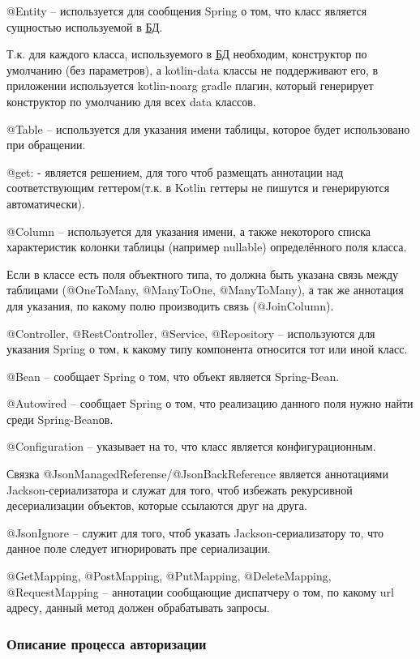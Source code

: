 @Entity – используется для сообщения Spring о том, что класс является сущностью используемой в \hyperlink{gloss:db}{БД}.

Т.к. для каждого класса, используемого в \hyperlink{gloss:db}{БД} необходим, конструктор по умолчанию (без параметров), а kotlin-data классы не поддерживают его, в приложении используется kotlin-noarg gradle плагин, который генерирует конструктор по умолчанию для всех data классов.

@Table – используется для указания имени таблицы, которое будет использовано при обращении.

@get: - является решением, для того чтоб размещать аннотации над соответствующим геттером(т.к. в Kotlin геттеры не пишутся и генерируются автоматически).

@Column – используется для указания имени, а также некоторого списка характеристик колонки таблицы (например nullable) определённого поля класса.

Если в классе есть поля объектного типа, то должна быть указана связь между таблицами (@OneToMany, @ManyToOne, @ManyToMany), а так же аннотация для указания, по какому полю производить связь (@JoinColumn).

@Controller, @RestController, @Service, @Repository – используются для указания Spring о том, к какому типу компонента относится тот или иной класс.

@Bean – сообщает Spring о том, что объект является Spring-Bean.

@Autowired – сообщает Spring о том, что реализацию данного поля нужно найти среди Spring-Beanов.

@Configuration – указывает на то, что класс является конфигурационным.

Связка @JsonManagedReferense/@JsonBackReference является аннотациями Jackson-сериализатора и служат для того, чтоб избежать рекурсивной десериализации объектов, которые ссылаются друг на друга.

@JsonIgnore – служит для того, чтоб указать Jackson-сериализатору то, что данное поле следует игнорировать пре сериализации.

@GetMapping, @PostMapping, @PutMapping, @DeleteMapping, @RequestMapping – аннотации сообщающие диспатчеру о том, по какому url адресу, данный метод должен обрабатывать запросы.

\subsubsection{Описание процесса авторизации}\indent


